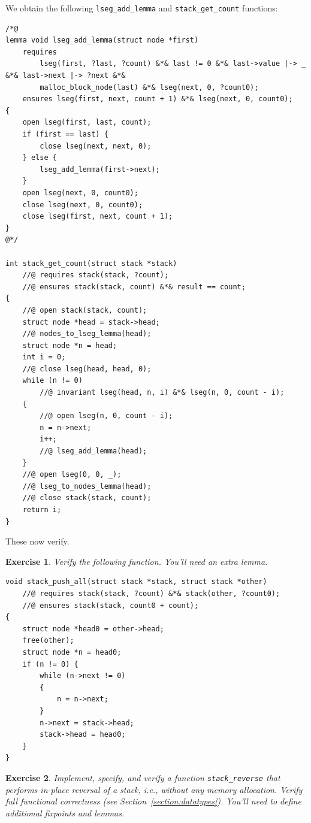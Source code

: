 \documentclass{article}
\newtheorem{exercise}{Exercise}
\begin{document}
We obtain the following \lstinline!lseg_add_lemma! and
\lstinline!stack_get_count! functions:
\begin{lstlisting}
/*@
lemma void lseg_add_lemma(struct node *first)
    requires
        lseg(first, ?last, ?count) &*& last != 0 &*& last->value |-> _ &*& last->next |-> ?next &*&
        malloc_block_node(last) &*& lseg(next, 0, ?count0);
    ensures lseg(first, next, count + 1) &*& lseg(next, 0, count0);
{
    open lseg(first, last, count);
    if (first == last) {
        close lseg(next, next, 0);
    } else {
        lseg_add_lemma(first->next);
    }
    open lseg(next, 0, count0);
    close lseg(next, 0, count0);
    close lseg(first, next, count + 1);
}
@*/

int stack_get_count(struct stack *stack)
    //@ requires stack(stack, ?count);
    //@ ensures stack(stack, count) &*& result == count;
{
    //@ open stack(stack, count);
    struct node *head = stack->head;
    //@ nodes_to_lseg_lemma(head);
    struct node *n = head;
    int i = 0;
    //@ close lseg(head, head, 0);
    while (n != 0)
        //@ invariant lseg(head, n, i) &*& lseg(n, 0, count - i);
    {
        //@ open lseg(n, 0, count - i);
        n = n->next;
        i++;
        //@ lseg_add_lemma(head);
    }
    //@ open lseg(0, 0, _);
    //@ lseg_to_nodes_lemma(head);
    //@ close stack(stack, count);
    return i;
}
\end{lstlisting}
These now verify.

\begin{exercise}\label{exercise:push_all}
Verify the following function. You'll need an extra lemma.
\end{exercise}
\begin{lstlisting}
void stack_push_all(struct stack *stack, struct stack *other)
    //@ requires stack(stack, ?count) &*& stack(other, ?count0);
    //@ ensures stack(stack, count0 + count);
{
    struct node *head0 = other->head;
    free(other);
    struct node *n = head0;
    if (n != 0) {
        while (n->next != 0)
        {
            n = n->next;
        }
        n->next = stack->head;
        stack->head = head0;
    }
}
\end{lstlisting}

\begin{exercise}\label{exercise:reverse}
Implement, specify, and verify a function
\lstinline!stack_reverse! that performs in-place reversal of a
stack, i.e., without any memory allocation. Verify full
functional correctness (see Section~\ref{section:datatypes}).
You'll need to define additional fixpoints and lemmas.
\end{exercise}
\end{document}
